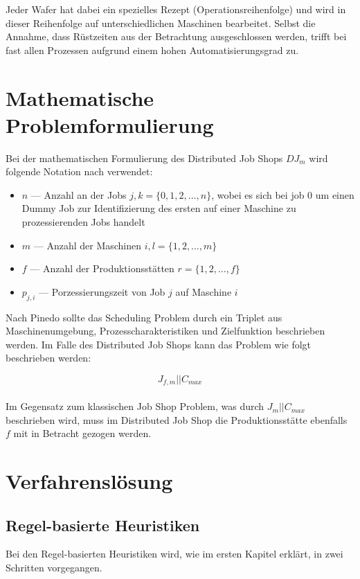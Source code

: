 \documentclass[final, english, ngerman, a4paper, 12pt, %
numbers=noenddot,
cd=true,
cdfont=false,cdfont=nohead,cdfont=nodin,
cdmath=false,
cdhead=false,
cdfoot=true,
cdcover=monochrome,
cdgeometry=symmetric,
declaration=heading,
declaration=notoc,
abstract=heading,
]{tudscrreprt}
\begin{document}
Jeder Wafer hat dabei ein spezielles Rezept (Operationsreihenfolge) und wird in dieser Reihenfolge auf unterschiedlichen Maschinen bearbeitet. Selbst die Annahme, dass Rüstzeiten aus der Betrachtung ausgeschlossen werden, trifft bei fast allen Prozessen aufgrund einem hohen Automatisierungsgrad zu.


\chapter{Mathematische Problemformulierung}

Bei der mathematischen Formulierung des Distributed Job Shops $DJ_m$ wird folgende Notation nach \cite{pinedo-scheduling} verwendet:

\begin{itemize}
	\item $n$ — Anzahl an der Jobs $j,k = \{0,1,2,\ldots, n\}$, wobei es sich bei job 0 um einen Dummy Job zur Identifizierung des ersten auf einer Maschine zu prozessierenden Jobs handelt
	\item $m$ — Anzahl der Maschinen $i, l = \{1, 2, \ldots, m\}$
	\item $f$ — Anzahl der Produktionsstätten $r = \{1, 2, \ldots, f\}$
	\item $p_{j,i}$ — Porzessierungszeit von Job $j$ auf Maschine $i$
\end{itemize}

Nach Pinedo sollte das Scheduling Problem durch ein Triplet aus Maschinenumgebung, Prozesscharakteristiken und Zielfunktion beschrieben werden. Im Falle des Distributed Job Shops kann das Problem wie folgt beschrieben werden:

\begin{equation}
J_{f,m} | | C_{max}
\end{equation} \\
Im Gegensatz zum klassischen Job Shop Problem, was durch $J_{m} | | C_{max}$ beschrieben wird, muss im Distributed Job Shop die Produktionsstätte ebenfalls $f$ mit in Betracht gezogen werden.

\chapter{Verfahrenslösung}
\section{Regel-basierte Heuristiken}

Bei den Regel-basierten Heuristiken wird, wie im ersten Kapitel erklärt, in zwei Schritten vorgegangen. 
\end{document}
